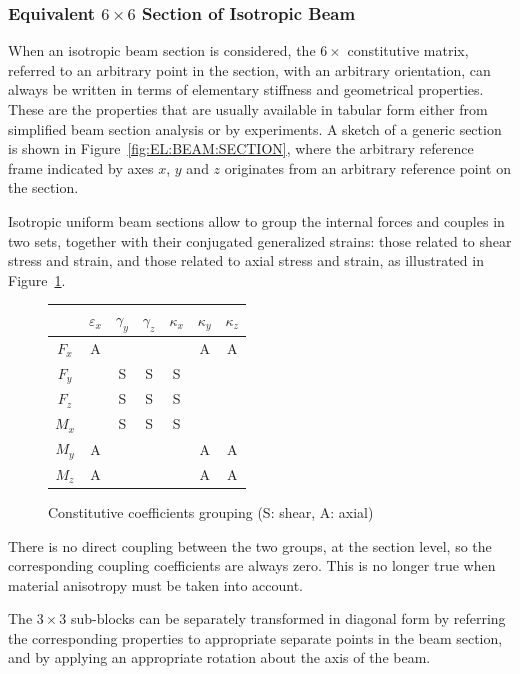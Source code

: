 \subsubsection{Equivalent $6\times6$ Section of Isotropic Beam}
When an isotropic beam section is considered, the $6\times$ 
constitutive matrix, referred to an arbitrary point in the section,
with an arbitrary orientation, can always be written in terms 
of elementary stiffness and geometrical properties.
These are the properties that are usually available in tabular form
either from simplified beam section analysis or by experiments.
A sketch of a generic section is shown
in Figure~\ref{fig:EL:BEAM:SECTION},
where the arbitrary reference frame indicated by axes 
$x$, $y$ and $z$ originates from an arbitrary reference point
on the section.

Isotropic uniform beam sections allow to group the internal forces 
and couples in two sets, together with their conjugated generalized 
strains:
those related to shear stress and strain, and those related 
to axial stress and strain, as illustrated
in Figure~\ref{fig:EL:BEAM:GROUPS}.
\begin{figure}[h]
\centering
\begin{tabular}{c|c|c|c|c|c|c|}
	&
		$\varepsilon_x$ &
		$\gamma_y$ &
		$\gamma_z$ &
		$\kappa_x$ &
		$\kappa_y$ &
		$\kappa_z$ \\
	\hline
	$F_x$ & A &   &   &   & A & A \\
	\hline
	$F_y$ &   & S & S & S &   &   \\
	\hline
	$F_z$ &   & S & S & S &   &   \\
	\hline
	$M_x$ &   & S & S & S &   &   \\
	\hline
	$M_y$ & A &   &   &   & A & A \\
	\hline
	$M_z$ & A &   &   &   & A & A \\
	\hline
\end{tabular}
\caption{Constitutive coefficients grouping (S: shear, A: axial)}
\label{fig:EL:BEAM:GROUPS}
\end{figure}
There is no direct coupling between the two groups, at the section level,
so the corresponding coupling coefficients are always zero.
This is no longer true when material anisotropy must be taken 
into account.

The $3\times3$ sub-blocks can be separately transformed 
in diagonal form by referring the corresponding properties
to appropriate separate points in the beam section, 
and by applying an appropriate rotation about the axis of the beam.



